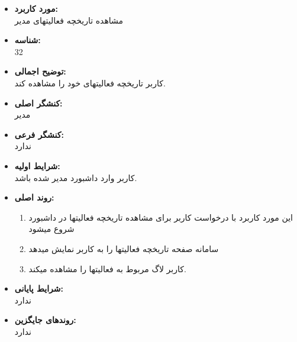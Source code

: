 \documentclass{article}
\begin{document}
\begin{itemize}
\item \textbf{مورد کاربرد:}\\
مشاهده تاریخچه فعالیتهای مدیر
\item \textbf{شناسه:}\\
32
\item \textbf{توضیح اجمالی:}\\
کاربر تاریخچه فعالیتهای خود را مشاهده کند.
\item \textbf{کنشگر اصلی:}\\
مدیر
\item \textbf{کنشگر فرعی:}\\
ندارد
\item \textbf{شرایط اولیه:}\\
کاربر وارد داشبورد مدیر شده باشد.
\item \textbf{روند اصلی:}\\
\begin{enumerate}
\item  این مورد کاربرد با درخواست کاربر برای مشاهده تاریخچه فعالیتها در داشبورد شروع میشود
\item سامانه صفحه  تاریخچه فعالیتها را به کاربر نمایش میدهد
\item کاربر لاگ مربوط به فعالیتها را مشاهده میکند.
\end{enumerate}
\item \textbf{شرایط پایانی:}\\ 
ندارد
\item \textbf{روندهای جایگزین:}\\
ندارد
\end{itemize}
\noindent\makebox[\linewidth]{\rule{\paperwidth}{0.4pt}}
\end{document}
